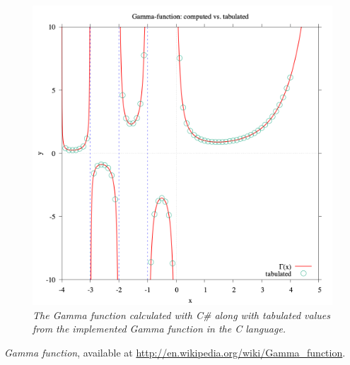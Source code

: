 \documentclass{article}
\begin{document}
\begin{figure}
    \centering
    \includegraphics[width=\textwidth]{Plot.png}
    \caption{\textit{The Gamma function calculated with C\# along with tabulated values from the implemented Gamma function
in the C language.}}
    \label{fig:Gamma}
\end{figure}



\begin{thebibliography}{99}

 \emph{Gamma function},  available at
\url{http://en.wikipedia.org/wiki/Gamma_function}.

\end{thebibliography}
\end{document}

